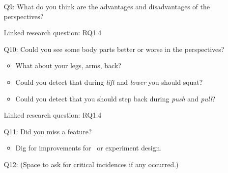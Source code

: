 \begin{itemize}
	\item[Q9:] What do you think are the advantages and disadvantages of the perspectives?
	\item[] Linked research question: RQ1.4
	
	\item[Q10:] Could you see some body parts better or worse in the perspectives?
	\begin{itemize}
		\item What about your legs, arms, back?
		\item Could you detect that during \textit{lift} and \textit{lower} you should squat?
		\item Could you detect that you should step back during \textit{push} and \textit{pull}?
	\end{itemize}
	\item[] Linked research question: RQ1.4
	
	\item[Q11:] Did you miss a feature?
	\begin{itemize}
		\item Dig for improvements for \exgo\ or experiment design.
	\end{itemize}
	
	\item[Q12:] (Space to ask for critical incidences if any occurred.)
\end{itemize}

